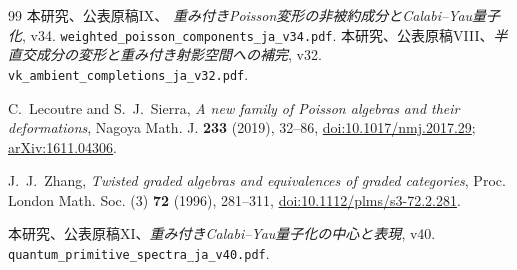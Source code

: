 \begin{thebibliography}{99}
 本研究、公表原稿IX、
\emph{重み付きPoisson変形の非被約成分とCalabi--Yau量子化}, v34.
\nolinkurl{weighted_poisson_components_ja_v34.pdf}.
本研究、公表原稿VIII、\emph{半直交成分の変形と重み付き射影空間への補完}, v32.
\nolinkurl{vk_ambient_completions_ja_v32.pdf}.

C.~Lecoutre and S.~J.~Sierra,
\emph{A new family of Poisson algebras and their deformations},
Nagoya Math. J. \textbf{233} (2019), 32--86,
\href{https://doi.org/10.1017/nmj.2017.29}{doi:10.1017/nmj.2017.29};
\href{https://arxiv.org/abs/1611.04306}{arXiv:1611.04306}.

J.~J.~Zhang,
\emph{Twisted graded algebras and equivalences of graded categories},
Proc. London Math. Soc. (3) \textbf{72} (1996), 281--311,
\href{https://doi.org/10.1112/plms/s3-72.2.281}{doi:10.1112/plms/s3-72.2.281}.



 本研究、公表原稿XI、\emph{重み付きCalabi--Yau量子化の中心と表現}, v40.
\nolinkurl{quantum_primitive_spectra_ja_v40.pdf}.




\end{thebibliography}
